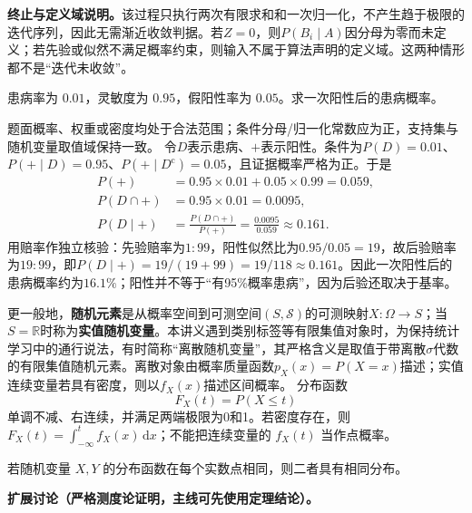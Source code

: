 \textbf{终止与定义域说明。}该过程只执行两次有限求和和一次归一化，不产生趋于极限的迭代序列，因此无需渐近收敛判据。若$Z=0$，则$P(B_i\mid A)$因分母为零而未定义；若先验或似然不满足概率约束，则输入不属于算法声明的定义域。这两种情形都不是“迭代未收敛”。

\label{struct:V1-C04-CH20}
\begin{example}[医学筛查的基率效应]\label{exm:V1-C04-base-rate}
患病率为 $0.01$，灵敏度为 $0.95$，假阳性率为 $0.05$。求一次阳性后的患病概率。
\end{example}
\begin{solution}
\SolGiven 题面概率、权重或密度均处于合法范围；条件分母/归一化常数应为正，支持集与随机变量取值域保持一致。
\SolDerive
令$D$表示患病、$+$表示阳性。条件为$P(D)=0.01$、$P(+\mid D)=0.95$、$P(+\mid D^{\mathrm c})=0.05$，且证据概率严格为正。于是
\[
\begin{aligned}
P(+)&=0.95\times0.01+0.05\times0.99=0.059,\\
P(D\cap+)&=0.95\times0.01=0.0095,\\
P(D\mid+)&=\frac{P(D\cap+)}{P(+)}
=\frac{0.0095}{0.059}\approx0.161.
\end{aligned}
\]
用赔率作独立核验：先验赔率为$1:99$，阳性似然比为$0.95/0.05=19$，故后验赔率为$19:99$，即$P(D\mid+)=19/(19+99)=19/118\approx0.161$。因此一次阳性后的患病概率约为$16.1\%$；阳性并不等于“有95\%概率患病”，因为后验还取决于基率。
\end{solution}


更一般地，\textbf{随机元素}是从概率空间到可测空间$(S,\mathcal S)$的可测映射$X:\Omega\to S$；当$S=\mathbb R$时称为\textbf{实值随机变量}。本讲义遇到类别标签等有限集值对象时，为保持统计学习中的通行说法，有时简称“离散随机变量”，其严格含义是取值于带离散$\sigma$代数的有限集值随机元素。离散对象由概率质量函数$p_X(x)=P(X=x)$描述；实值连续变量若具有密度，则以$f_X(x)$描述区间概率。
分布函数
\[
F_X(t)=P(X\le t)
\]
单调不减、右连续，并满足两端极限为0和1。若密度存在，则 $F_X(t)=\int_{-\infty}^{t}f_X(x)\,\mathrm dx$；不能把连续变量的 $f_X(t)$ 当作点概率。

\label{struct:V1-C04-CH12}
\begin{theorem}[分布函数唯一确定分布]
若随机变量 $X,Y$ 的分布函数在每个实数点相同，则二者具有相同分布。
\end{theorem}
\label{struct:V1-C04-CH15}
\textbf{扩展讨论（严格测度论证明，主线可先使用定理结论）。}
